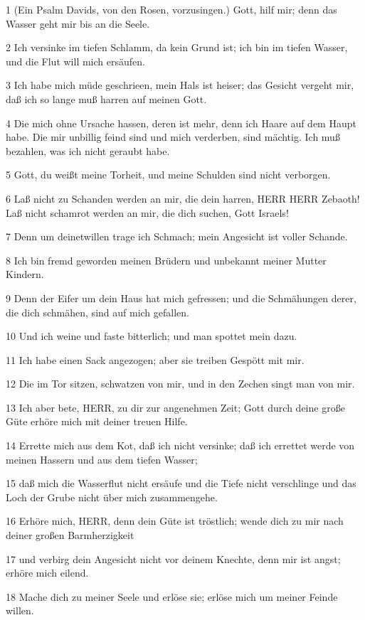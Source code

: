 \par 1 (Ein Psalm Davids, von den Rosen, vorzusingen.) Gott, hilf mir; denn das Wasser geht mir bis an die Seele.
\par 2 Ich versinke im tiefen Schlamm, da kein Grund ist; ich bin im tiefen Wasser, und die Flut will mich ersäufen.
\par 3 Ich habe mich müde geschrieen, mein Hals ist heiser; das Gesicht vergeht mir, daß ich so lange muß harren auf meinen Gott.
\par 4 Die mich ohne Ursache hassen, deren ist mehr, denn ich Haare auf dem Haupt habe. Die mir unbillig feind sind und mich verderben, sind mächtig. Ich muß bezahlen, was ich nicht geraubt habe.
\par 5 Gott, du weißt meine Torheit, und meine Schulden sind nicht verborgen.
\par 6 Laß nicht zu Schanden werden an mir, die dein harren, HERR HERR Zebaoth! Laß nicht schamrot werden an mir, die dich suchen, Gott Israels!
\par 7 Denn um deinetwillen trage ich Schmach; mein Angesicht ist voller Schande.
\par 8 Ich bin fremd geworden meinen Brüdern und unbekannt meiner Mutter Kindern.
\par 9 Denn der Eifer um dein Haus hat mich gefressen; und die Schmähungen derer, die dich schmähen, sind auf mich gefallen.
\par 10 Und ich weine und faste bitterlich; und man spottet mein dazu.
\par 11 Ich habe einen Sack angezogen; aber sie treiben Gespött mit mir.
\par 12 Die im Tor sitzen, schwatzen von mir, und in den Zechen singt man von mir.
\par 13 Ich aber bete, HERR, zu dir zur angenehmen Zeit; Gott durch deine große Güte erhöre mich mit deiner treuen Hilfe.
\par 14 Errette mich aus dem Kot, daß ich nicht versinke; daß ich errettet werde von meinen Hassern und aus dem tiefen Wasser;
\par 15 daß mich die Wasserflut nicht ersäufe und die Tiefe nicht verschlinge und das Loch der Grube nicht über mich zusammengehe.
\par 16 Erhöre mich, HERR, denn dein Güte ist tröstlich; wende dich zu mir nach deiner großen Barmherzigkeit
\par 17 und verbirg dein Angesicht nicht vor deinem Knechte, denn mir ist angst; erhöre mich eilend.
\par 18 Mache dich zu meiner Seele und erlöse sie; erlöse mich um meiner Feinde willen.
